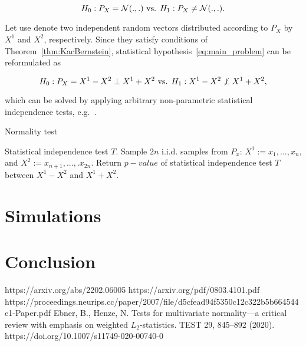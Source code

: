 \documentclass{article}
\begin{document}
\begin{equation}
\label{eq:main_problem}
H_{0}: P_{X} = \mathcal N(.,.) \textnormal{ vs. }  H_{1}: P_{X} \neq \mathcal N(.,.).
\end{equation}


Let use denote two independent random vectors distributed according to $P_{X}$ by $X^{1}$ and $X^{2}$, respectively. Since they satisfy conditions of Theorem~\ref{thm:KacBernstein}, statistical hypothesis~\ref{eq:main_problem} can be reformulated as

\begin{equation}
H_{0}: P_{X} = X^{1}-X^{2} \perp X^{1} + X^{2}  \textnormal{ vs. } H_{1}:  X^{1}-X^{2} \not \perp X^{1} + X^{2},
\end{equation}

\noindent which can be solved by applying arbitrary non-parametric statistical independence tests, e.g.~\cite{ref2, hsic}.

\begin{algorithm}
\label{algo:kbtest}
\caption{Normality test}\label{alg:cap}
\begin{algorithmic}
\Require Statistical independence test $T$.
\State Sample $2n$ i.i.d. samples from $P_{x}$: $X^{1} := x_{1},...,x_{n}$, and $X^{2} := x_{n+1},...,.x_{2n}$.
\State Return $p-value$ of statistical independence test $T$ between $X^{1} - X^{2}$ and $X^{1}  + X^{2}$. 
\end{algorithmic}
\end{algorithm}

\section{Simulations}

\section{Conclusion}


\begin{thebibliography}{9}
https://arxiv.org/abs/2202.06005
https://arxiv.org/pdf/0803.4101.pdf
https://proceedings.neurips.cc/paper/2007/file/d5cfead94f5350c12c322b5b664544c1-Paper.pdf
Ebner, B., Henze, N. Tests for multivariate normality—a critical review with emphasis on weighted $L_{2}$-statistics. TEST 29, 845–892 (2020). https://doi.org/10.1007/s11749-020-00740-0

\end{thebibliography}
\end{document}
